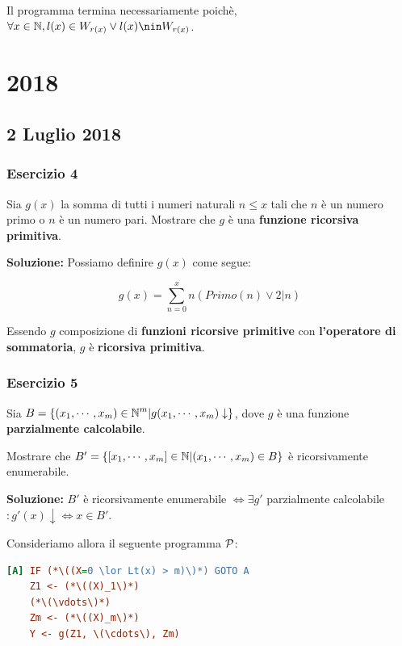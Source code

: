 Il programma termina necessariamente poichè, \(\forall x \in \mbN, l(x) \in W_{r(x)} \lor l(x) \nin W_{r(x)}\).

\section{2018}

\subsection{2 Luglio 2018}

\subsubsection{Esercizio 4}

Sia \(g(x)\) la somma di tutti i numeri naturali \(n\leq x\) tali che \(n\) è un numero primo o \(n\) è un numero pari. Mostrare che \(g\) è una \textbf{funzione ricorsiva primitiva}.

\textbf{Soluzione:} Possiamo definire \(g(x)\) come segue:

\begin{equation}
  g(x) = \sum_{n=0}^{x} n(Primo(n) \lor 2\vert n)
\end{equation}

Essendo \(g\) composizione di \textbf{funzioni ricorsive primitive} con \textbf{l'operatore di sommatoria}, \(g\) è \textbf{ricorsiva primitiva}.

\subsubsection{Esercizio 5}

Sia \(B=\displaystyle{\left\{{(x_1, \cdots, x_m) \in \mathbb{N}^m \vert g(x_1, \cdots, x_m)\downarrow}\right\}}\), dove \(g\) è una funzione \textbf{parzialmente calcolabile}.

Mostrare che \(B'=\displaystyle{\left\{{[x_1, \cdots, x_m] \in \mathbb{N}\vert (x_1, \cdots, x_m) \in B}\right\}}\) è ricorsivamente enumerabile.

\textbf{Soluzione:} \(B'\) è ricorsivamente enumerabile \(\iff \exists g'\) parzialmente calcolabile \(: g'(x) \downarrow \iff x \in B'\).

Consideriamo allora il seguente programma \(\mathcal{P}\):

\begin{lstlisting}[language=ini, caption={ }]
[A] IF (*\((X=0 \lor Lt(x) > m)\)*) GOTO A
    Z1 <- (*\((X)_1\)*)
    (*\(\vdots\)*)
    Zm <- (*\((X)_m\)*)
    Y <- g(Z1, \(\cdots\), Zm)
\end{lstlisting}

